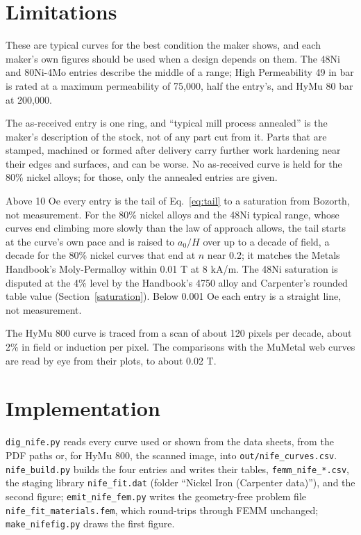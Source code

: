 \documentclass[
  11pt,
]{article}
\begin{document}
\section{Limitations}\label{limitations}

These are typical curves for the best condition the maker shows, and each maker's own figures should be used when a design depends on them. The 48Ni and 80Ni-4Mo entries describe the middle of a range; High Permeability 49 in bar is rated at a maximum permeability of 75,000, half the entry's, and HyMu 80 bar at 200,000.

The as-received entry is one ring, and ``typical mill process annealed'' is the maker's description of the stock, not of any part cut from it. Parts that are stamped, machined or formed after delivery carry further work hardening near their edges and surfaces, and can be worse. No as-received curve is held for the 80\% nickel alloys; for those, only the annealed entries are given.

Above 10 Oe every entry is the tail of Eq.~\eqref{eq:tail} to a saturation from Bozorth, not measurement. For the 80\% nickel alloys and the 48Ni typical range, whose curves end climbing more slowly than the law of approach allows, the tail starts at the curve's own pace and is raised to \(a_0/H\) over up to a decade of field, a decade for the 80\% nickel curves that end at \(n\) near 0.2; it matches the Metals Handbook's Moly-Permalloy within 0.01 T at 8 kA/m. The 48Ni saturation is disputed at the 4\% level by the Handbook's 4750 alloy and Carpenter's rounded table value (Section~\ref{saturation}). Below 0.001 Oe each entry is a straight line, not measurement.

The HyMu 800 curve is traced from a scan of about 120 pixels per decade, about 2\% in field or induction per pixel. The comparisons with the MuMetal web curves are read by eye from their plots, to about 0.02 T.

\section{Implementation}\label{implementation}

\texttt{dig\_nife.py} reads every curve used or shown from the data sheets, from the PDF paths or, for HyMu 800, the scanned image, into \texttt{out/nife\_curves.csv}. \texttt{nife\_build.py} builds the four entries and writes their tables, \texttt{femm\_nife\_*.csv}, the staging library \texttt{nife\_fit.dat} (folder ``Nickel Iron (Carpenter data)''), and the second figure; \texttt{emit\_nife\_fem.py} writes the geometry-free problem file \texttt{nife\_fit\_materials.fem}, which round-trips through FEMM unchanged; \texttt{make\_nifefig.py} draws the first figure.
\end{document}
